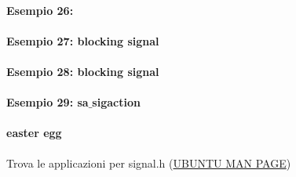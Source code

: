 \paragraph{Esempio 26:}\hfill \break


\paragraph{Esempio 27: blocking signal}\hfill \break


\paragraph{Esempio 28: blocking signal} \hfill \break


\paragraph{Esempio 29: sa$\_$sigaction}\hfill \break



\paragraph{easter egg} Trova le applicazioni per signal.h (\href{http://manpages.ubuntu.com/manpages/trusty/man7/signal.h.7posix.html}{UBUNTU MAN PAGE})
